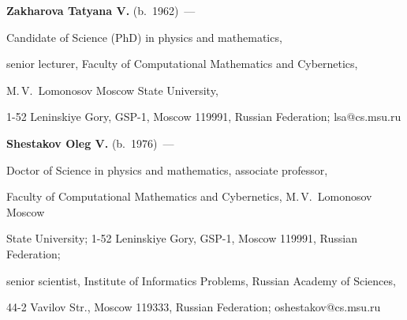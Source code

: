\noindent


\textbf{Zakharova Tatyana V.} (b.\ 1962)~---


Candidate of Science (PhD) in physics and mathematics,


senior lecturer, Faculty of Computational Mathematics and Cybernetics,


M.\,V.~Lomonosov Moscow State University,


1-52  Leninskiye Gory, GSP-1, Moscow 119991, Russian Federation;  lsa@cs.msu.ru





\vspace*{3pt}





\noindent


\textbf{Shestakov Oleg V.} (b.\ 1976)~---


Doctor of Science in physics and mathematics, associate professor,


Faculty of Computational Mathematics and Cybernetics, M.\,V.~Lomonosov Moscow


State University; 1-52  Leninskiye Gory, GSP-1, Moscow 119991, Russian Federation;


senior scientist, Institute of Informatics Problems, Russian Academy of Sciences,


44-2 Vavilov Str., Moscow 119333, Russian Federation;  oshestakov@cs.msu.ru





 \label{end\stat}





\renewcommand{\bibname}{\protect\rm Литература}